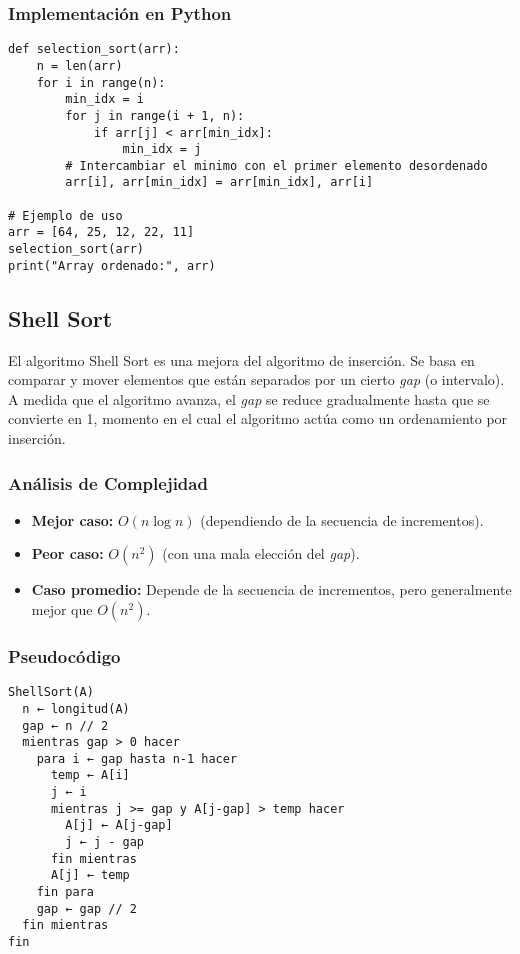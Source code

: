 \documentclass[11pt,openany]{book}
\begin{document}
\subsubsection{Implementación en Python}
\lstset{language=Python}
\begin{lstlisting}
def selection_sort(arr):
    n = len(arr)
    for i in range(n):
        min_idx = i
        for j in range(i + 1, n):
            if arr[j] < arr[min_idx]:
                min_idx = j
        # Intercambiar el minimo con el primer elemento desordenado
        arr[i], arr[min_idx] = arr[min_idx], arr[i]

# Ejemplo de uso
arr = [64, 25, 12, 22, 11]
selection_sort(arr)
print("Array ordenado:", arr)
\end{lstlisting}

\subsection{Shell Sort}
El algoritmo Shell Sort es una mejora del algoritmo de inserción. Se basa en comparar y mover elementos que están separados por un cierto \textit{gap} (o intervalo). A medida que el algoritmo avanza, el \textit{gap} se reduce gradualmente hasta que se convierte en 1, momento en el cual el algoritmo actúa como un ordenamiento por inserción.

\subsubsection{Análisis de Complejidad}
\begin{itemize}
    \item \textbf{Mejor caso:} $O(n \log n)$ (dependiendo de la secuencia de incrementos).
    \item \textbf{Peor caso:} $O(n^2)$ (con una mala elección del \textit{gap}).
    \item \textbf{Caso promedio:} Depende de la secuencia de incrementos, pero generalmente mejor que $O(n^2)$.
\end{itemize}

\subsubsection{Pseudocódigo}
\begin{verbatim}
ShellSort(A)
  n ← longitud(A)
  gap ← n // 2
  mientras gap > 0 hacer
    para i ← gap hasta n-1 hacer
      temp ← A[i]
      j ← i
      mientras j >= gap y A[j-gap] > temp hacer
        A[j] ← A[j-gap]
        j ← j - gap
      fin mientras
      A[j] ← temp
    fin para
    gap ← gap // 2
  fin mientras
fin
\end{verbatim}
\end{document}

